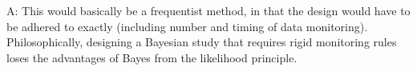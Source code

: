 \documentclass[12pt]{article}
\begin{document}
A: This would basically be a frequentist method, in that the design would have to be adhered to exactly (including number and timing of data monitoring). Philosophically, designing a Bayesian study that requires rigid monitoring rules loses the advantages of Bayes from the likelihood principle.
%
%
%
%
%				
%
%


%
			
\end{document}
